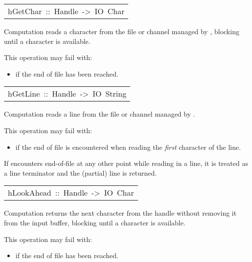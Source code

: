 \begin{haddockdesc}
\item[\begin{tabular}{@{}l}
hGetChar\ ::\ Handle\ ->\ IO\ Char
\end{tabular}]\haddockbegindoc
Computation   reads a character from the file or
 channel managed by , blocking until a character is available.
\par
This operation may fail with:
\par
\begin{itemize}
\item
  if the end of file has been reached.
\par

\end{itemize}

\end{haddockdesc}
\begin{haddockdesc}
\item[\begin{tabular}{@{}l}
hGetLine\ ::\ Handle\ ->\ IO\ String
\end{tabular}]\haddockbegindoc
Computation   reads a line from the file or
 channel managed by .
\par
This operation may fail with:
\par
\begin{itemize}
\item
  if the end of file is encountered when reading
    the \emph{first} character of the line.
\par

\end{itemize}
If  encounters end-of-file at any other point while reading
 in a line, it is treated as a line terminator and the (partial)
 line is returned.
\par

\end{haddockdesc}
\begin{haddockdesc}
\item[\begin{tabular}{@{}l}
hLookAhead\ ::\ Handle\ ->\ IO\ Char
\end{tabular}]\haddockbegindoc
Computation  returns the next character from the handle
 without removing it from the input buffer, blocking until a character
 is available.
\par
This operation may fail with:
\par
\begin{itemize}
\item
  if the end of file has been reached.
\par

\end{itemize}

\end{haddockdesc}
